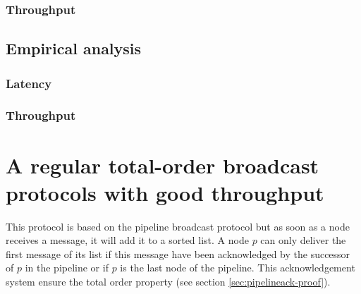 \documentclass[a4paper]{article}
\begin{document}
\subsubsection*{Throughput}

\subsection{Empirical analysis}

\subsubsection*{Latency}

\subsubsection*{Throughput}

\section{A regular total-order broadcast protocols with good throughput}
\label{sec:throughputTO}

This protocol is based on the pipeline broadcast protocol but as soon as a node
receives a message, it will add it to a sorted list. A node $p$ can only deliver the
first message of its list if this message have been acknowledged by the
successor of $p$ in the pipeline or if $p$ is the last node of the pipeline.
This acknowledgement system ensure the total order property (see section
\ref{sec:pipelineack-proof}).
\end{document}
